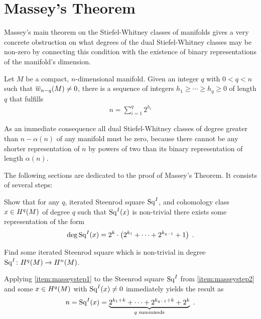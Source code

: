 % 

\chapter{Massey's Theorem}

Massey's main theorem on the Stiefel-Whitney classes of manifolds
gives a very concrete obstruction on what degrees of the dual
Stiefel-Whitney classes may be non-zero
by connecting this condition with the existence of binary
representations of the manifold's dimension.
\begin{Thm}[Massey]\label{thm:massey}
  Let $M$ be a compact, $n$-dimensional manifold.
  Given an integer $q$ with $0<q<n$ such that ${\overline{w}_{n-q}}(M)\neq0$,
  there is a sequence of integers $h_1\geq\dotsb\geq h_q\geq0$ of
  length $q$ that fulfills
  \begin{gather*}
    n = \sum_{i=1}^{q} 2^{h_i}
  \end{gather*}
\end{Thm}

As an immediate consequence all dual Stiefel-Whitney classes of degree
greater than $n-\alpha(n)$ of any manifold must be zero, because there
cannot be any shorter representation of $n$ by powers of two
than its binary representation of length $\alpha(n)$.

The following sections are dedicated to the proof of Massey's Theorem.
It consists of several steps:
\begin{steps}
\item\label{item:masseystep1}
  Show that for any $q$, iterated Steenrod square $\mathrm{Sq}^{I}$, and cohomology
  class $x\in H^q(M)$ of degree $q$ such that $\mathrm{Sq}^{I}(x)$ is non-trivial there exists
  some representation of the form
  \begin{gather*}
    \deg \mathrm{Sq}^{I}(x)
    = 2^k\cdot
    \left( 2^{k_1}+\dotsb+2^{k_{q-1}} + 1 \right)
    \;.
  \end{gather*}
\item\label{item:masseystep2}
  Find some iterated Steenrod square which is non-trivial in degree
  $\mathrm{Sq}^{I}\colon H^q(M)\to H^n(M)$.
\end{steps}
Applying \ref{item:masseystep1} to the Steenrod square $\mathrm{Sq}^{I}$ from
\ref{item:masseystep2} and some $x\in H^q(M)$ with $\mathrm{Sq}^{I}(x)\neq 0$
immediately yields the result as
\begin{gather*}
  n = \mathrm{Sq}^{I}(x) = \underbrace
  {2^{k_1+k}+\dotsb+2^{k_{q-1}+k} + 2^{k}}_{\text{$q$ summands}}
  \;.
\end{gather*}




  


